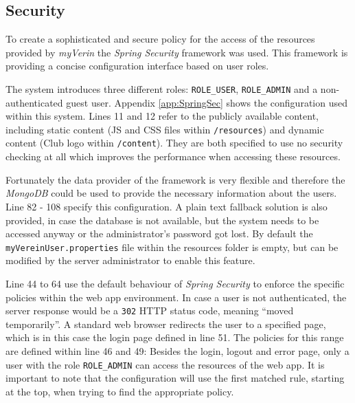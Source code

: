 \subsection{Security}
\label{sec:ImplementationSec}

To create a sophisticated and secure policy for the access of the resources provided by \emph{myVerin} the \emph{Spring Security} framework was used. This framework is providing a concise configuration interface based on user roles.

The system introduces three different roles: \texttt{ROLE\_USER}, \texttt{ROLE\_ADMIN} and a non-authenticated guest user. Appendix \vref{app:SpringSec} shows the configuration used within this system. Lines 11 and 12 refer to the publicly available content, including static content (\gls{JS} and \gls{CSS} files within \texttt{/resources}) and dynamic content (Club logo within \texttt{/content}). They are both specified to use no security checking at all which improves the performance when accessing these resources.

Fortunately the data provider of the framework is very flexible and therefore the \emph{MongoDB} could be used to provide the necessary information about the users. Line 82 - 108 specify this configuration. A plain text fallback solution is also provided, in case the database is not available, but the system needs to be accessed anyway or the administrator's password got lost. By default the \texttt{myVereinUser.properties} file within the resources folder is empty, but can be modified by the server administrator to enable this feature.

Line 44 to 64 use the default behaviour of \emph{Spring Security} to enforce the specific policies within the web app environment. In case a user is not authenticated, the server response would be a \texttt{302} HTTP status code, meaning \enquote{moved temporarily}. A standard web browser redirects the user to a specified page, which is in this case the login page defined in line 51. The policies for this range are defined within line 46 and 49: Besides the login, logout and error page, only a user with the role \texttt{ROLE\_ADMIN} can access the resources of the web app. It is important to note that the configuration will use the first matched rule, starting at the top, when trying to find the appropriate policy.

